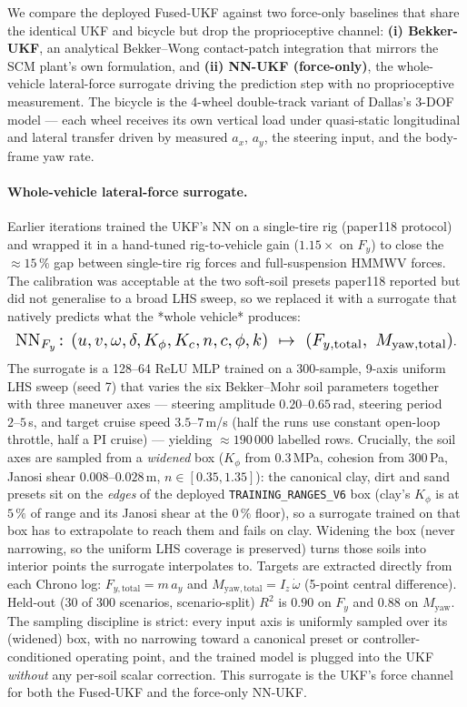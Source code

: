 \documentclass[conference,letterpaper,10pt]{IEEEtran}
\begin{document}
We compare the deployed Fused-UKF against two force-only baselines that
share the identical UKF and bicycle but drop the proprioceptive
channel: \textbf{(i) Bekker-UKF}, an analytical Bekker--Wong
contact-patch integration that mirrors the SCM plant's own formulation,
and \textbf{(ii) NN-UKF (force-only)}, the whole-vehicle lateral-force
surrogate driving the prediction step with no proprioceptive
measurement. The bicycle is the 4-wheel double-track variant of
Dallas's 3-DOF model --- each wheel receives its own vertical load
under quasi-static longitudinal and lateral transfer driven by measured
$a_x$, $a_y$, the steering input, and the body-frame yaw rate.

\paragraph{Whole-vehicle lateral-force surrogate.} Earlier iterations
trained the UKF's NN on a single-tire rig (paper118 protocol) and
wrapped it in a hand-tuned rig-to-vehicle gain
($1.15\times$ on $F_y$) to close the $\approx 15\,\%$ gap between
single-tire rig forces and full-suspension HMMWV forces. The
calibration was acceptable at the two soft-soil presets paper118
reported but did not generalise to a broad LHS sweep, so we replaced
it with a surrogate that natively predicts what the *whole vehicle*
produces:
\[
  \resizebox{\columnwidth}{!}{$\displaystyle
  \mathrm{NN}_{F_y}\!:\, (u, v, \omega, \delta, K_\phi, K_c, n,
  c, \phi, k)\ \mapsto\ (F_{y,\mathrm{total}},\ M_{\mathrm{yaw,total}})$}.
\]
The surrogate is a 128–64 ReLU MLP trained on a 300-sample,
9-axis uniform LHS sweep
(seed 7)
that varies the six Bekker--Mohr soil parameters together with three
maneuver axes — steering amplitude $0.20\text{--}0.65\,$rad,
steering period $2\text{--}5\,$s, and target cruise speed
$3.5\text{--}7\,$m/s (half the runs use constant open-loop throttle,
half a PI cruise) — yielding $\approx 190\,000$ labelled rows.
Crucially, the soil axes are sampled from a \emph{widened} box
($K_\phi$ from $0.3\,$MPa, cohesion from $300\,$Pa, Janosi shear
$0.008\text{--}0.028\,$m, $n\in[0.35,1.35]$): the canonical clay,
dirt and sand presets sit on the \emph{edges} of the deployed
\texttt{TRAINING\_RANGES\_V6} box (clay's $K_\phi$ is at $5\,\%$ of
range and its Janosi shear at the $0\,\%$ floor), so a surrogate
trained on that box has to extrapolate to reach them and fails on
clay. Widening the box (never narrowing, so the uniform LHS coverage
is preserved) turns those soils into interior points the surrogate
interpolates to.
Targets are extracted directly from each Chrono log:
$F_{y,\mathrm{total}}\!=\!m\,a_y$ and
$M_{\mathrm{yaw,total}}\!=\!I_z\,\dot\omega$ (5-point central
difference). Held-out (30 of 300 scenarios, scenario-split) $R^2$ is
$0.90$ on $F_y$ and $0.88$ on $M_{\mathrm{yaw}}$. The sampling
discipline is strict: every input axis is uniformly sampled over its
(widened) box, with no narrowing toward a canonical preset or
controller-conditioned operating point, and the trained model is
plugged into the UKF \emph{without} any per-soil scalar correction. This surrogate is the
UKF's force channel for both the Fused-UKF and the force-only NN-UKF.
\end{document}
